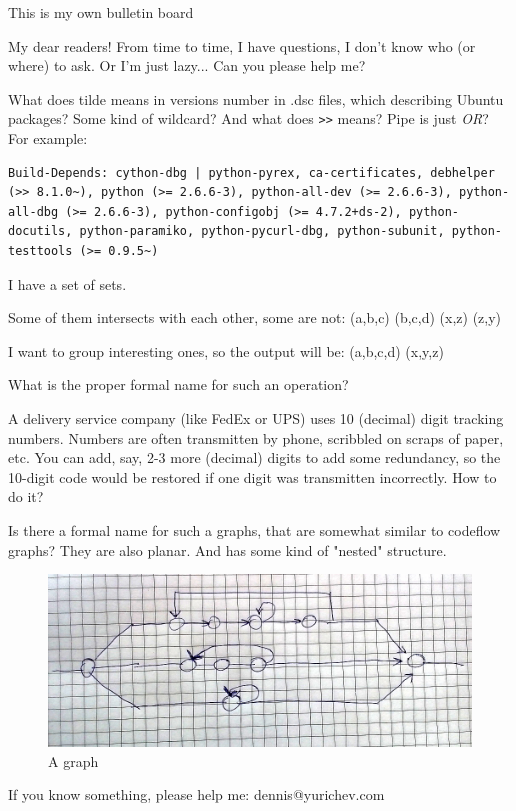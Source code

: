 
\begin{center}
\LARGE{} This is my own bulletin board \normalsize{}
\end{center}

My dear readers! From time to time, I have questions, I don't know who (or where) to ask.
Or I'm just lazy...
Can you please help me?

\myhrule{}

What does tilde means in versions number in .dsc files, which describing Ubuntu packages?
Some kind of wildcard?
And what does \verb|>>| means?
Pipe is just \emph{OR}?
For example:

\begin{lstlisting}
Build-Depends: cython-dbg | python-pyrex, ca-certificates, debhelper (>> 8.1.0~), python (>= 2.6.6-3), python-all-dev (>= 2.6.6-3), python-all-dbg (>= 2.6.6-3), python-configobj (>= 4.7.2+ds-2), python-docutils, python-paramiko, python-pycurl-dbg, python-subunit, python-testtools (>= 0.9.5~)
\end{lstlisting}

\myhrule{}

I have a set of sets.

Some of them intersects with each other, some are not: (a,b,c) (b,c,d) (x,z) (z,y)

I want to group interesting ones, so the output will be: (a,b,c,d) (x,y,z)

What is the proper formal name for such an operation?

\myhrule{}

A delivery service company (like FedEx or UPS) uses 10 (decimal) digit tracking numbers.
Numbers are often transmitten by phone, scribbled on scraps of paper, etc.
You can add, say, 2-3 more (decimal) digits to add some redundancy, so the 10-digit code would be restored
if one digit was transmitten incorrectly.
How to do it?

\myhrule{}

Is there a formal name for such a graphs, that are somewhat similar to codeflow graphs?
They are also planar.
And has some kind of "nested" structure.

\begin{figure}[H]
\centering
\includegraphics[width=\textwidth]{1st_page}
\caption{A graph}
\end{figure}

\myhrule{}

If you know something, please help me: dennis@yurichev.com

